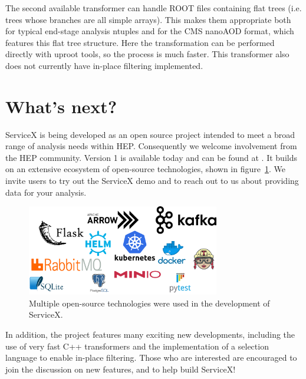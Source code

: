 \documentclass{webofc}
\begin{document}
The second available transformer can handle ROOT files containing flat trees (i.e. trees whose
branches are all simple arrays). This makes them appropriate both for typical end-stage analysis
ntuples and for the CMS nanoAOD format, which features this flat tree structure. Here the
transformation can be performed directly with uproot tools, so the process is much faster. This
transformer also does not currently have in-place filtering implemented.


\section{What's next?}
\label{sec:whatNext}

ServiceX is being developed as an open source project intended to meet a broad range of analysis
needs within HEP. Consequently we welcome involvement from the HEP community. Version 1 is
available today and can be found at \cite{RefServiceX}. It builds on an extensive ecosystem of
open-source technologies, shown in figure~\ref{fig:openSourceTech}. We invite users to try out the
ServiceX demo and to reach out to us about providing data for your analysis.

\begin{figure}[ht]
  \centering
  \includegraphics[width=0.75\textwidth]{openSourceTech}
  \caption{Multiple open-source technologies were used in the development of ServiceX.}
  \label{fig:openSourceTech}
\end{figure}

In addition, the project features many exciting new developments, including the use of very fast
C++ transformers and the implementation of a selection language to enable in-place filtering. Those
who are interested are encouraged to join the discussion on new features, and to help build
ServiceX!
\end{document}
